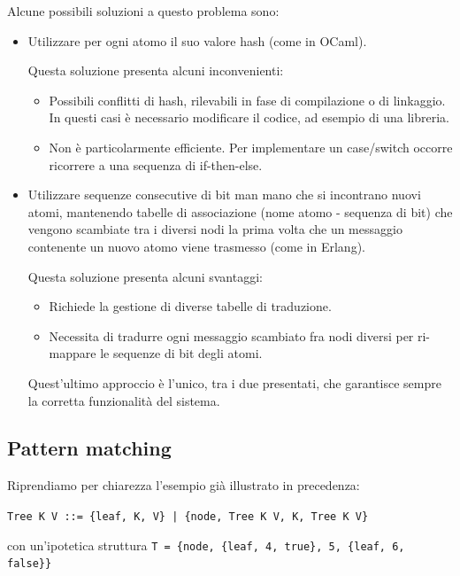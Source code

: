\documentclass{article}
\begin{document}
Alcune possibili soluzioni a questo problema sono:
\begin{itemize}
    \item Utilizzare per ogni atomo il suo valore hash (come in OCaml). 
    
    Questa soluzione presenta alcuni inconvenienti:
    \begin{itemize}
        \item Possibili conflitti di hash, rilevabili in fase di compilazione o di linkaggio. In questi casi è necessario modificare il codice, ad esempio di una libreria.
        \item Non è particolarmente efficiente. Per implementare un case/switch occorre ricorrere a una sequenza di if-then-else.
    \end{itemize}
    \item Utilizzare sequenze consecutive di bit man mano che si incontrano nuovi atomi, mantenendo tabelle di associazione (nome atomo - sequenza di bit) che vengono scambiate tra i diversi nodi la prima volta che un messaggio contenente un nuovo atomo viene trasmesso (come in Erlang).
    
    Questa soluzione presenta alcuni svantaggi:
    \begin{itemize}
        \item Richiede la gestione di diverse tabelle di traduzione.
        \item Necessita di tradurre ogni messaggio scambiato fra nodi diversi per ri-mappare le sequenze di bit degli atomi.
    \end{itemize}

    Quest'ultimo approccio è l'unico, tra i due presentati, che garantisce sempre la corretta funzionalità del sistema.
\end{itemize}

\subsection*{Pattern matching}
Riprendiamo per chiarezza l'esempio già illustrato in precedenza:
\begin{center}
    \texttt{Tree K V ::= \{leaf, K, V\} | \{node, Tree K V, K, Tree K V\}}    
\end{center}
con un'ipotetica struttura \texttt{T = \{node, \{leaf, 4, true\}, 5, \{leaf, 6, false\}\}}
\end{document}
